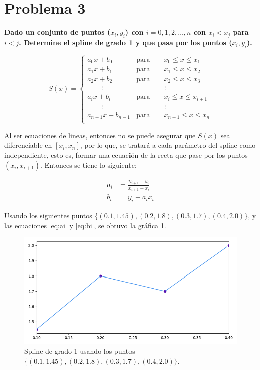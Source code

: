 \section*{Problema 3}

\textbf{Dado un conjunto de puntos ($x_i,y_i$) con $i=0,1,2,\dots,n$ con $x_i<x_j$ para $i<j$. Determine el spline de grado 1 y que pasa por los puntos ($x_i,y_i$).}

\begin{equation*}
    S(x) = \begin{cases}
        a_0 x + b_0         & \text{para}\qquad  x_0 \leq x \leq x_1       \\
        a_1 x + b_1         & \text{para}\qquad  x_1 \leq x \leq x_2       \\
        a_2 x + b_2         & \text{para}\qquad  x_2 \leq x \leq x_3       \\
        \qquad \vdots       & \qquad \qquad \vdots                         \\
        a_i x + b_i         & \text{para}\qquad  x_i \leq x \leq x_{i+1}   \\
        \qquad \vdots       & \qquad \qquad \vdots                         \\
        a_{n-1} x + b_{n-1} & \text{para}\qquad  x_{n-1} \leq x \leq x_{n} \\
    \end{cases}
\end{equation*}


Al ser ecuaciones de lineas, entonces no se puede asegurar que $S(x)$ sea diferenciable en $[x_i,x_n]$, por lo que, se tratará a cada parámetro del spline como independiente, esto es, formar una ecuación de la recta que pase por los puntos $(x_i,x_{i+1})$. Entonces se tiene lo siguiente:

\begin{align}
    a_i & = \frac{y_{i+1}-y_{i}}{x_{i+1}-x_i} \label{eq:ai} \\
    b_i & = y_i - a_i x_i \label{eq:bi}
\end{align}

Usando los siguientes puntos $\{(0.1,1.45) ,(0.2,1.8), (0.3,1.7),( 0.4,2.0)\}$, y las ecuaciones \ref{eq:ai} y \ref{eq:bi}, se obtuvo la gráfica \ref{fig:problema3}.

\begin{figure}[H]
    \centering
    \includegraphics[width=14 cm]{Graphics/problema3.png}
    \caption{Spline de grado 1 usando los puntos $\{(0.1,1.45) ,(0.2,1.8), (0.3,1.7),( 0.4,2.0)\}$.}
    \label{fig:problema3}
\end{figure}

\pagebreak